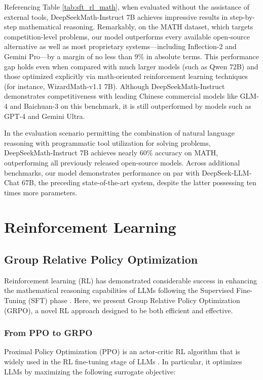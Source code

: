 \begin{itemize}[topsep=0pt]
\begin{itemize}[topsep=0pt]
Referencing Table \ref{tab:sft_rl_math}, when evaluated without the assistance of external tools, DeepSeekMath-Instruct 7B achieves impressive results in step-by-step mathematical reasoning. Remarkably, on the MATH dataset, which targets competition-level problems, our model outperforms every available open-source alternative as well as most proprietary systems—including Inflection-2 and Gemini Pro—by a margin of no less than 9\% in absolute terms. This performance gap holds even when compared with much larger models (such as Qwen 72B) and those optimized explicitly via math-oriented reinforcement learning techniques (for instance, WizardMath-v1.1 7B). Although DeepSeekMath-Instruct demonstrates competitiveness with leading Chinese commercial models like GLM-4 and Baichuan-3 on this benchmark, it is still outperformed by models such as GPT-4 and Gemini Ultra.

In the evaluation scenario permitting the combination of natural language reasoning with programmatic tool utilization for solving problems, DeepSeekMath-Instruct 7B achieves nearly 60\% accuracy on MATH, outperforming all previously released open-source models. Across additional benchmarks, our model demonstrates performance on par with DeepSeek-LLM-Chat 67B, the preceding state-of-the-art system, despite the latter possessing ten times more parameters.
\section{Reinforcement Learning}

\subsection{Group Relative Policy Optimization} Reinforcement learning (RL) has demonstrated considerable success in enhancing the mathematical reasoning capabilities of LLMs following the Supervised Fine-Tuning (SFT) phase \citep{wang2023math,wizardmath}. Here, we present Group Relative Policy Optimization (GRPO), a novel RL approach designed to be both efficient and effective.

\subsubsection{From PPO to GRPO} Proximal Policy Optimization (PPO) \citep{schulman2017proximal} is an actor-critic RL algorithm that is widely used in the RL fine-tuning stage of LLMs \citep{ouyang2022training}. In particular, it optimizes LLMs by maximizing the following surrogate objective:


\end{itemize}
\end{itemize}
